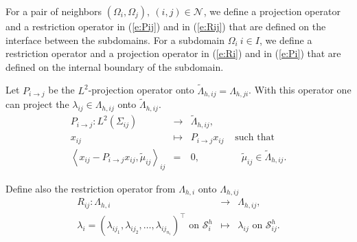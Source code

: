 \documentclass{article}
\newcommand{\bral}{\left<}
\newcommand{\brar}{\right>}
\newcommand{\Sh}[1]{\mathcal{S}^{h}_{#1}}
\newcommand{\Nui}[1]{{\mathcal N}_{#1}}
\newcommand{\dps}{\displaystyle}
\begin{document}
For a pair of neighbors $(\Omega_i, \Omega_j), \ (i,j) \in \Nui{}$, we define a
projection operator and a restriction operator in (\ref{e:Pij}) and in
(\ref{e:Rij}) that are defined on the interface between the subdomains. For a
subdomain $\Omega_i \ i \in I$, we define a restriction operator and a
projection operator in (\ref{e:Ri}) and in (\ref{e:Pi}) that are defined on the
internal boundary of the subdomain.

Let $P_{i\rightarrow j}$ be the $L^2$-projection operator onto $\tilde
\Lambda_{h,ij} = \Lambda_{h,ji}$. With this operator one can project the
$\lambda_{ij} \in \Lambda_{h,ij}$ onto $\tilde \Lambda_{h,ij}$.
\begin{equation}  \label{e:Pij}\begin{array}{rcll}
P_{i\rightarrow j} : L^2(\Sigma_{ij}) & \longrightarrow &  \tilde \Lambda_{h,ij}, \\
\dps  x_{ij} & \longmapsto & P_{i\rightarrow j} x_{ij} & \mbox{ such that } \\
\bral x_{ij} -  P_{i\rightarrow j} x_{ij}, \tilde \mu_{ij} \brar_{ij} 
& = & 0, & \quad \tilde \mu_{ij} \in  \tilde \Lambda_{h,ij}.
\end{array}\end{equation}


Define also the restriction operator from $\Lambda_{h,i}$ onto $\Lambda_{h,ij}$
\begin{equation} \label{e:Rij}\begin{array}{rcll}
  R_{ij}: \Lambda_{h,i} & \longrightarrow &  \Lambda_{h,ij}, \\
\lambda_i = \left(  \lambda_{ij_1}, 
      \lambda_{ij_2}, 
      \ldots,
      \lambda_{ij_{n_i}}
  \right)^{\top} 
 \mbox{ on } \Sh{i}  &  \longmapsto & \lambda_{ij} \mbox{ on } \Sh{ij}.
\end{array}\end{equation}
\end{document}
